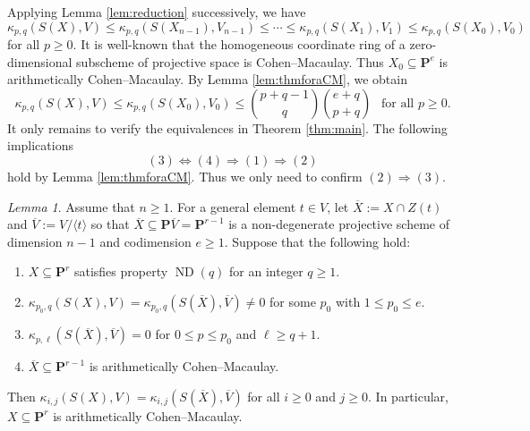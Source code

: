 \documentclass[12pt]{amsart}
\theoremstyle{definition}
\theoremstyle{remark}
\theoremstyle{corollary}
\theoremstyle{theorem}
\theoremstyle{corollary}
\newtheorem{lemma}[theorem]{Lemma}
\theoremstyle{corollary}
\theoremstyle{definition}
\theoremstyle{remark}
\numberwithin{equation}{section}
\def\nP{\mathbf{P}}
\DeclareMathOperator{\ND}{ND}
\begin{document}
\medskip

Applying Lemma \ref{lem:reduction} successively, we have
$$
\kappa_{p,q}(S(X), V)\leq \kappa_{p,q}(S(X_{n-1}), V_{n-1}) \leq \cdots \leq \kappa_{p,q}(S(X_1), V_1) \leq \kappa_{p,q}(S(X_0), V_0)
$$
for all $p \geq 0$. It is well-known that the homogeneous coordinate ring of a zero-dimensional subscheme of projective space is Cohen--Macaulay. Thus $X_0 \subseteq \nP^e$ is arithmetically Cohen--Macaulay. By Lemma \ref{lem:thmforaCM}, we obtain
$$
\kappa_{p,q}(S(X), V) \leq \kappa_{p,q}(S(X_0), V_0) \leq {p+q-1 \choose q} {e+q \choose p+q}~~\text{ for all $p \geq 0$}.
$$
It only remains to verify the equivalences in Theorem \ref{thm:main}. The following implications
$$
(3) \Longleftrightarrow (4) \Longrightarrow (1) \Longrightarrow (2)
$$
hold by Lemma \ref{lem:thmforaCM}.  Thus we only need to confirm $(2) \Longrightarrow (3)$. 

\begin{lemma}\label{lem:X_1aCM}
Assume that $n \geq 1$. For a general element $t \in V$, let $\overline{X}:=X \cap Z(t)$ and $\overline{V}:=V/\langle t \rangle$ so that $\overline{X}\subseteq \nP \overline{V}= \nP^{r-1}$ is a non-degenerate projective scheme of dimension $n-1$ and codimension $e \geq 1$. 
Suppose that the following hold:
\begin{enumerate}
    \item[$(a)$] $X \subseteq \nP^{r}$ satisfies property $\ND(q)$ for an integer $q \geq 1$.
    \item[$(b)$] $\kappa_{p_0,q}(S(X), V) = \kappa_{p_0, q}(S(\overline{X}), \overline{V}) \neq 0$ for some $p_0$ with $1 \leq p_0 \leq e$.
    \item[$(c)$] $\kappa_{p,\ell}(S(\overline{X}), \overline{V})=0$ for $0 \leq p \leq p_0$ and $\ell \geq q+1$.
    \item[$(d)$]  $\overline{X} \subseteq \nP^{r-1}$ is arithmetically Cohen--Macaulay.
\end{enumerate}
Then $\kappa_{i,j}(S(X), V) = \kappa_{i,j}(S(\overline{X}), \overline{V})$ for all $i \geq 0$ and $j \geq 0$. In particular,  $X \subseteq \nP^{r}$ is arithmetically Cohen--Macaulay.
\end{lemma}
\end{document}
